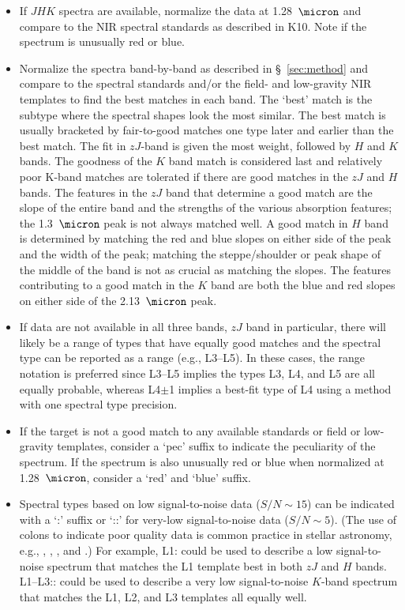 \documentclass[12pt,preprint]{aastex}
\begin{document}
\begin{itemize}
	\item If $JHK$ spectra are available, normalize the data at 1.28~$\micron$ and compare to the NIR spectral standards as described in K10. Note if the spectrum is unusually red or blue.
	
	\item Normalize the spectra band-by-band as described in \S~\ref{sec:method} and compare to the spectral standards and/or the field- and low-gravity NIR templates to find the best matches in each band.
	The `best' match is the subtype where the spectral shapes look the most similar. The best match is usually bracketed by fair-to-good matches one type later and earlier than the best match.
	The fit in $zJ$-band is given the most weight, followed by $H$ and $K$ bands. The goodness of the $K$ band match is considered last and relatively poor K-band matches are tolerated if there are good matches in the $zJ$ and $H$ bands. 
	The features in the $zJ$ band that determine a good match are the slope of the entire band and the strengths of the various absorption features; the 1.3~$\micron$ peak is not always matched well. 
	A good match in $H$ band is determined by matching the red and blue slopes on either side of the peak and the width of the peak; matching the steppe/shoulder or peak shape of the middle of the band is not as crucial as matching the slopes. 
The features contributing to a good match in the $K$ band are both the blue and red slopes on either side of the 2.13~$\micron$ peak.	
	\item If data are not available in all three bands, $zJ$ band in particular, there will likely be a range of types that have equally good matches and the spectral type can be reported as a range (e.g., L3--L5). In these cases, the range notation is preferred since L3--L5 implies the types L3, L4, and L5 are all equally probable, whereas L4$\pm$1 implies a best-fit type of L4 using a method with one spectral type precision.
	\item If the target is not a good match to any available standards or field or low-gravity templates, consider a `pec' suffix to indicate the peculiarity of the spectrum. If the spectrum is also unusually red or blue when normalized at 1.28~$\micron$, consider a `red' and `blue' suffix.
	\item Spectral types based on low signal-to-noise data ($S/N\sim15$) can be indicated with a `:' suffix or `::' for very-low signal-to-noise data ($S/N\sim5$). 
	(The use of colons to indicate poor quality data is common practice in stellar astronomy, e.g., \citet{Sanduleak:1988fn}, \cite{Silvestri:2006el}, \citet[Table 12.1]{Gray:2009wd}, and \cite{Covey:2010de}.) For example, L1: could be used to describe a low signal-to-noise spectrum that matches the L1 template best in both $zJ$ and $H$ bands. L1--L3:: could be used to describe a very low signal-to-noise $K$-band spectrum that matches the L1, L2, and L3 templates all equally well. %

\end{itemize}	
\end{document}
